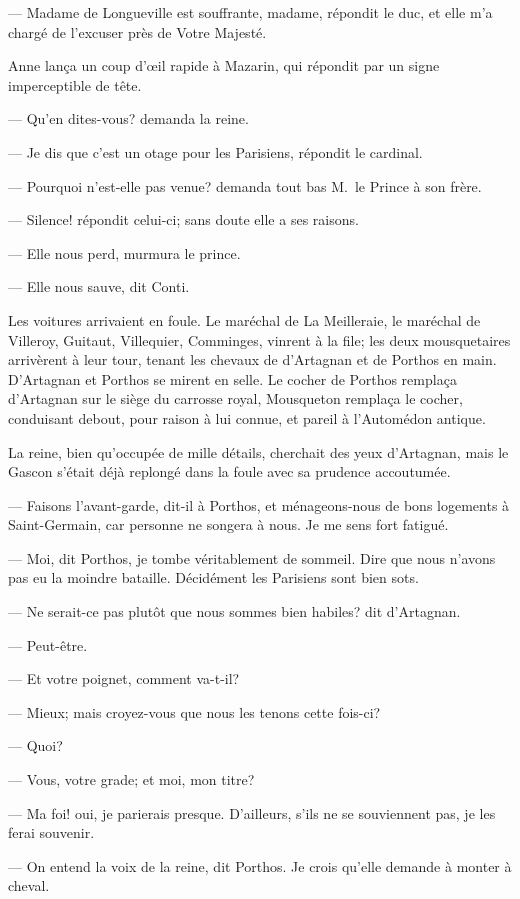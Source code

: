 — Madame de Longueville est souffrante, madame, répondit le duc, et elle m'a chargé de l'excuser près de Votre Majesté.

Anne lança un coup d'œil rapide à Mazarin, qui répondit par un signe imperceptible de tête.

— Qu'en dites-vous? demanda la reine.

— Je dis que c'est un otage pour les Parisiens, répondit le cardinal.

— Pourquoi n'est-elle pas venue? demanda tout bas M.~le Prince à son frère.

— Silence! répondit celui-ci; sans doute elle a ses raisons.

— Elle nous perd, murmura le prince.

— Elle nous sauve, dit Conti.

Les voitures arrivaient en foule. Le maréchal de La Meilleraie, le maréchal de Villeroy, Guitaut, Villequier, Comminges, vinrent à la file; les deux mousquetaires arrivèrent à leur tour, tenant les chevaux de d'Artagnan et de Porthos en main. D'Artagnan et Porthos se mirent en selle. Le cocher de Porthos remplaça d'Artagnan sur le siège du carrosse royal, Mousqueton remplaça le cocher, conduisant debout, pour raison à lui connue, et pareil à l'Automédon antique.

La reine, bien qu'occupée de mille détails, cherchait des yeux d'Artagnan, mais le Gascon s'était déjà replongé dans la foule avec sa prudence accoutumée.

— Faisons l'avant-garde, dit-il à Porthos, et ménageons-nous de bons logements à Saint-Germain, car personne ne songera à nous. Je me sens fort fatigué.

— Moi, dit Porthos, je tombe véritablement de sommeil. Dire que nous n'avons pas eu la moindre bataille. Décidément les Parisiens sont bien sots.

— Ne serait-ce pas plutôt que nous sommes bien habiles? dit d'Artagnan.

— Peut-être.

— Et votre poignet, comment va-t-il?

— Mieux; mais croyez-vous que nous les tenons cette fois-ci?

— Quoi?

— Vous, votre grade; et moi, mon titre?

— Ma foi! oui, je parierais presque. D'ailleurs, s'ils ne se souviennent pas, je les ferai souvenir.

— On entend la voix de la reine, dit Porthos. Je crois qu'elle demande à monter à cheval.

